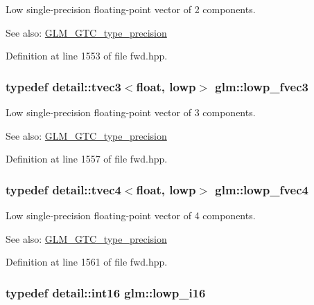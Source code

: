 Low single-precision floating-point vector of 2 components. \begin{Desc}
\item[See also:]\hyperlink{group__gtc__type__precision}{GLM\_\-GTC\_\-type\_\-precision} \end{Desc}


Definition at line 1553 of file fwd.hpp.\hypertarget{group__gtc__type__precision_g83d77dfe136d4add9e214cd205320c12}{
\subsubsection[lowp\_\-fvec3]{\setlength{\rightskip}{0pt plus 5cm}typedef detail::tvec3$<$float, lowp$>$ {\bf glm::lowp\_\-fvec3}}}
\label{group__gtc__type__precision_g83d77dfe136d4add9e214cd205320c12}


Low single-precision floating-point vector of 3 components. \begin{Desc}
\item[See also:]\hyperlink{group__gtc__type__precision}{GLM\_\-GTC\_\-type\_\-precision} \end{Desc}


Definition at line 1557 of file fwd.hpp.\hypertarget{group__gtc__type__precision_g0d016cdbff067c450122115d0620bf85}{
\subsubsection[lowp\_\-fvec4]{\setlength{\rightskip}{0pt plus 5cm}typedef detail::tvec4$<$float, lowp$>$ {\bf glm::lowp\_\-fvec4}}}
\label{group__gtc__type__precision_g0d016cdbff067c450122115d0620bf85}


Low single-precision floating-point vector of 4 components. \begin{Desc}
\item[See also:]\hyperlink{group__gtc__type__precision}{GLM\_\-GTC\_\-type\_\-precision} \end{Desc}


Definition at line 1561 of file fwd.hpp.\hypertarget{group__gtc__type__precision_gf7bbfd31bcec25a416ea94d09efb5451}{
\subsubsection[lowp\_\-i16]{\setlength{\rightskip}{0pt plus 5cm}typedef detail::int16 {\bf glm::lowp\_\-i16}}}
\label{group__gtc__type__precision_gf7bbfd31bcec25a416ea94d09efb5451}


